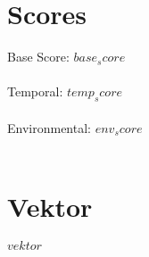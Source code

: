 \documentclass[12pt,oneside]{article}
\title{\vspace{-4.0cm}\assetname}
\author{\vul}
\newcommand{\base}{$base_score$}
\newcommand{\temporal}{$temp_score$}
\newcommand{\environmental}{$env_score$}
\newcommand{\vektor}{$vektor$}
\begin{document}
	
	
	
	\maketitle


	\vspace{2.0cm}
	\section*{Scores}
	
 
		{\Large Base Score: \base } 
		\\\\
		{\Large Temporal: \temporal }
		\\\\
		{\Large Environmental: \environmental }
		\\\\
		
	

    
	\section*{Vektor}
	\vektor
\end{document}
